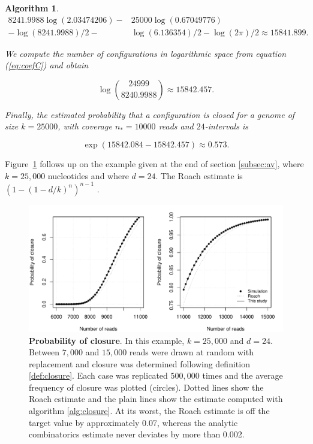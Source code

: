\documentclass{article}
\newtheorem{algorithm}{Algorithm}
\begin{document}
\begin{algorithm}
\begin{equation*}
\begin{split}
8241.9988\log(2.03474206) - &25000\log(0.67049776) \\
- \log(8241.9988)/2 - &\log(6.136354)/2 - \log(2\pi)/2
\approx 15841.899.
\end{split}
\end{equation*}

We compute the number of configurations in logarithmic space from equation
(\ref{eq:coefC}) and obtain

\begin{equation*}
\log { 24999 \choose 8240.9988 } \approx 15842.457.
\end{equation*}

Finally, the estimated probability that a configuration is closed for a
genome of size $k=25000$, with coverage $n_* = 10000$ reads and
$24$-intervals is

\begin{equation*}
\exp(15842.084-15842.457) \approx 0.573.
\end{equation*}


\end{algorithm}


Figure~\ref{fig:closureprob} follows up on the example given at the end of
section \ref{subsec:av}, where $k = 25,000$ nucleotides and where $d=24$.
The Roach estimate is $(1-(1-d/k)^n)^{n-1}$ \cite{pmid8808467}.

\begin{figure}[h]
\centering
\includegraphics[scale=0.585]{Fig4.pdf}
\caption{\textbf{Probability of closure}. In this example, $k=25,000$ and
$d=24$. Between $7,000$ and $15,000$ reads were drawn at random with
replacement and closure was determined following definition
\ref{def:closure}. Each case was replicated $500,000$ times and the
average frequency of closure was plotted (circles). Dotted lines show the
Roach estimate and the plain lines show the estimate computed with
algorithm \ref{alg:closure}. At its worst, the Roach estimate is off the
target value by approximately 0.07, whereas the analytic combinatorics
estimate never deviates by more than 0.002.}
\label{fig:closureprob}
\end{figure}
\end{document}
